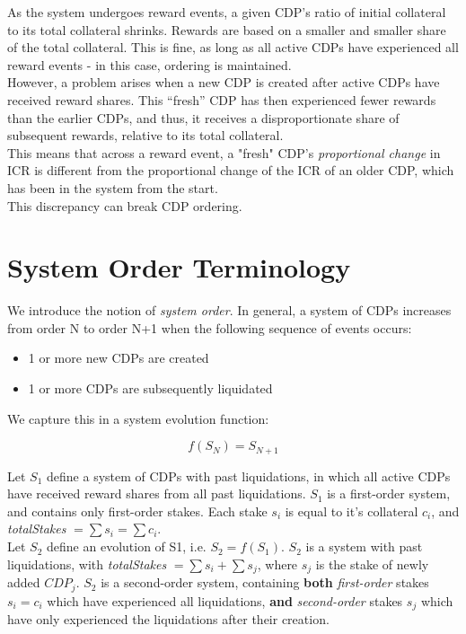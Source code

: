 \documentclass[reqno]{article}
\begin{document}
As the system undergoes reward events, a given CDP’s ratio of initial collateral to its total collateral shrinks. Rewards are based on a smaller and smaller share of the total collateral. This is fine, as long as all active CDPs have experienced all reward events - in this case, ordering is maintained.\\

However, a problem arises when a new CDP is created after active CDPs have received reward shares.  This “fresh” CDP has then experienced fewer rewards than the earlier CDPs, and thus, it receives a disproportionate share of subsequent rewards, relative to its total collateral.\\

This means that across a reward event, a "fresh" CDP’s \textit{proportional change} in ICR is different from the proportional change of the ICR of an older CDP, which has been in the system from the start.\\

This discrepancy can break CDP ordering.\\

\section{System Order Terminology}

We introduce the notion of \textit{system order}. In general, a system of CDPs increases from order N to order N+1 when the following sequence of events occurs:

\begin{itemize}
  \item 1 or more new CDPs are created 
  \item 1 or more CDPs are subsequently liquidated
\end{itemize}

We capture this in a system evolution function:

\begin{equation} 
    f(S_N)=S_{N+1}
\end{equation}

\bigskip
Let $S_1$ define a system of CDPs with past liquidations, in which all active CDPs have received reward shares from all past liquidations. $S_1$ is a first-order system, and contains only first-order stakes. Each stake $s_i$ is equal to it’s collateral $c_i$, and \textit{totalStakes} $= \sum s_i = \sum c_i$.\\

Let $S_2$ define an evolution of S1, i.e. $S_2 = f(S_1)$. $S_2$ is a system with past liquidations, with \textit{totalStakes} $= \sum s_i + \sum s_j$, where $s_j$ is the stake of newly added $CDP_j$. $S_2$ is a second-order system, containing \textbf{both} \textit{first-order} stakes $s_i = c_i$ which have experienced all liquidations, \textbf{and} \textit{second-order} stakes $s_j$ which have only experienced the liquidations after their creation.\\
\end{document}
